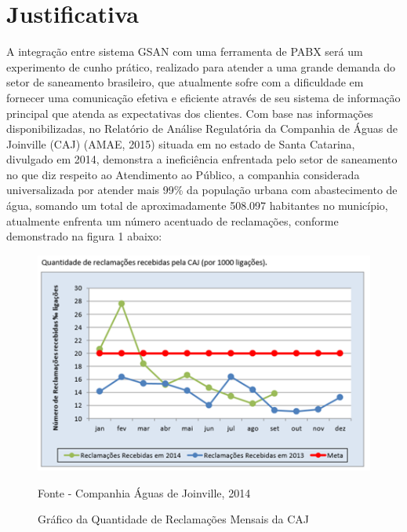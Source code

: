 \section{Justificativa}
A integração entre sistema GSAN com uma ferramenta de PABX será um experimento de cunho prático, realizado para atender a uma grande demanda do setor de saneamento brasileiro, que atualmente sofre com a dificuldade em fornecer uma comunicação efetiva e eficiente através de seu sistema de informação principal que atenda as expectativas dos clientes.
Com base nas informações disponibilizadas, no Relatório de Análise Regulatória da Companhia de Águas de Joinville (CAJ) (AMAE, 2015) situada em no estado de Santa Catarina, divulgado em 2014, demonstra a ineficiência enfrentada pelo setor de saneamento no que diz respeito ao Atendimento ao Público, a companhia considerada universalizada por atender mais 99\% da população urbana com abastecimento de água, somando um total de aproximadamente 508.097 habitantes no município, atualmente enfrenta um número acentuado de reclamações, conforme demonstrado na figura 1 abaixo:
 

\begin{figure}[!htb]
	\centering
	\includegraphics{figuras/LigacoesReclamacoes.png}
	\caption{Gráfico da Quantidade de Reclamações Mensais da CAJ}	
	Fonte - Companhia Águas de Joinville, 2014
\end{figure}


